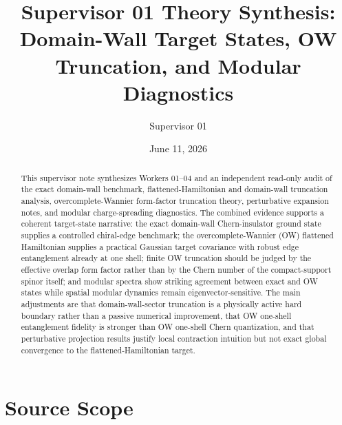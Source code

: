 \documentclass[aps,prb,onecolumn,nofootinbib,superscriptaddress]{revtex4-2}
\begin{document}
\title{Supervisor 01 Theory Synthesis: Domain-Wall Target States, OW Truncation, and Modular Diagnostics}
\author{Supervisor 01}
\date{June 11, 2026}

\begin{abstract}
This supervisor note synthesizes Workers 01--04 and an independent read-only audit of the exact domain-wall benchmark, flattened-Hamiltonian and domain-wall truncation analysis, overcomplete-Wannier form-factor truncation theory, perturbative expansion notes, and modular charge-spreading diagnostics.  The combined evidence supports a coherent target-state narrative: the exact domain-wall Chern-insulator ground state supplies a controlled chiral-edge benchmark; the overcomplete-Wannier (OW) flattened Hamiltonian supplies a practical Gaussian target covariance with robust edge entanglement already at one shell; finite OW truncation should be judged by the effective overlap form factor rather than by the Chern number of the compact-support spinor itself; and modular spectra show striking agreement between exact and OW states while spatial modular dynamics remain eigenvector-sensitive.  The main adjustments are that domain-wall-sector truncation is a physically active hard boundary rather than a passive numerical improvement, that OW one-shell entanglement fidelity is stronger than OW one-shell Chern quantization, and that perturbative projection results justify local contraction intuition but not exact global convergence to the flattened-Hamiltonian target.
\end{abstract}

\maketitle
\setcounter{tocdepth}{2}
\tableofcontents

\section{Source Scope}
\end{document}
